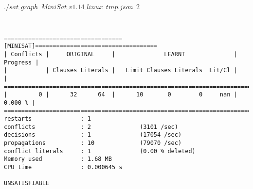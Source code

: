 \documentclass[french, 12pt]{report}
\newcommand{\formula}[1]{
\begin{center}
{#1}
\end{center}
}
\begin{document}
\formula{$./sat\_graph\ \ MiniSat\_v1.14\_linux\ \ tmp.json\ \ 2$}
\ \\
\begin{lstlisting}
==================================[MINISAT]===================================
| Conflicts |     ORIGINAL     |              LEARNT              | Progress |
|           | Clauses Literals |   Limit Clauses Literals  Lit/Cl |          |
==============================================================================
|         0 |      32      64  |      10       0        0     nan |  0.000 % |
==============================================================================
restarts              : 1
conflicts             : 2              (3101 /sec)
decisions             : 1              (17054 /sec)
propagations          : 10             (79070 /sec)
conflict literals     : 1              (0.00 % deleted)
Memory used           : 1.68 MB
CPU time              : 0.000645 s

UNSATISFIABLE


\end{lstlisting}
\end{document}

